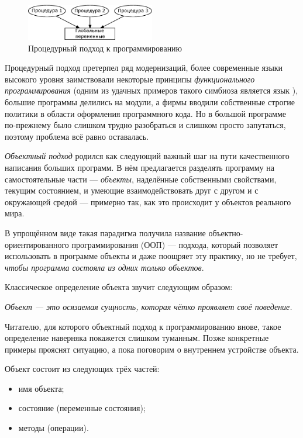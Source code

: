 \begin{figure}[htb]
\begin{center}
\includegraphics[width=0.5\textwidth]{img/ris_10_1}
\caption{Процедурный подход к программированию}
\label{ch10:refDrawing0}
\end{center}
\end{figure}



Процедурный подход претерпел ряд модернизаций, более современные языки высокого уровня заимствовали некоторые принципы
\emph{функционального программирования} (одним из удачных примеров такого симбиоза является язык ),
большие программы делились на модули, а фирмы вводили собственные строгие политики в области оформления программного
кода. Но в большой программе по-прежнему было слишком трудно разобраться и слишком просто запутаться, поэтому проблема
всё равно оставалась.

\emph{Объектный подход} родился как следующий важный шаг на пути качественного написания больших программ.
В нём предлагается разделять программу на самостоятельные части --- \emph{объекты}, наделённые
собственными свойствами, текущим состоянием, и умеющие взаимодействовать друг с другом и с окружающей средой --- примерно
так, как это происходит у объектов реального мира.

В упрощённом виде такая парадигма получила название объектно-ориентированного программирования (ООП) --- подхода, который
позволяет использовать в программе объекты и даже поощряет эту практику, но не требует, \emph{чтобы
программа состояла из одних только объектов}.

Классическое определение объекта звучит следующим образом:

\emph{Объект --- это осязаемая сущность, которая чётко проявляет своё поведение.}

Читателю, для которого объектный подход к программированию внове, такое определение наверняка покажется слишком
туманным. Позже конкретные примеры прояснят  ситуацию, а пока поговорим о внутреннем устройстве объекта.

Объект состоит из следующих трёх частей:

\begin{itemize}
\item имя объекта;
\item состояние (переменные состояния);
\item методы (операции).
\end{itemize}

